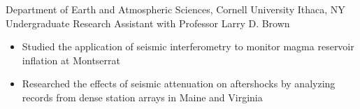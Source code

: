 
        {Department of Earth and Atmospheric Sciences, Cornell University}
        {Ithaca, NY}
        {Undergraduate Research Assistant}
        {with Professor Larry D. Brown}{
    \begin{itemize}
        \item Studied the application of seismic interferometry to monitor magma reservoir inflation at Montserrat
        \item Researched the effects of seismic attenuation on aftershocks by analyzing records from dense station arrays in Maine and Virginia
    \end{itemize}
}
